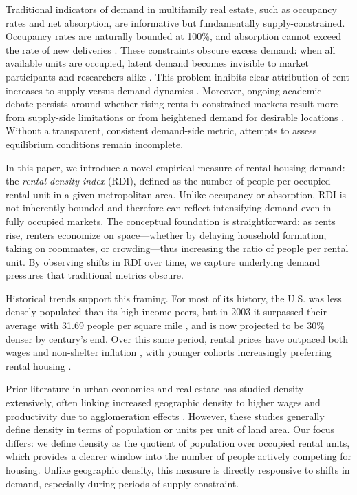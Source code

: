 \documentclass[sn-mathphys-num]{sn-jnl}%
\begin{document}
Traditional indicators of demand in multifamily real estate, such as occupancy rates and net absorption, are informative but fundamentally supply-constrained. Occupancy rates are naturally bounded at 100\%, and absorption cannot exceed the rate of new deliveries \citep{mueller1999real}. These constraints obscure excess demand: when all available units are occupied, latent demand becomes invisible to market participants and researchers alike \citep{gabriel2001rental, sirmans1991determinants, pyhrr1999real}. This problem inhibits clear attribution of rent increases to supply versus demand dynamics \citep{pennington2021does, molloy2022housing}. Moreover, ongoing academic debate persists around whether rising rents in constrained markets result more from supply-side limitations \citep{saiz2010geographic} or from heightened demand for desirable locations \citep{davidoff2015supply}. Without a transparent, consistent demand-side metric, attempts to assess equilibrium conditions remain incomplete.

In this paper, we introduce a novel empirical measure of rental housing demand: the \textit{rental density index} (RDI), defined as the number of people per occupied rental unit in a given metropolitan area. Unlike occupancy or absorption, RDI is not inherently bounded and therefore can reflect intensifying demand even in fully occupied markets. The conceptual foundation is straightforward: as rents rise, renters economize on space---whether by delaying household formation, taking on roommates, or crowding---thus increasing the ratio of people per rental unit. By observing shifts in RDI over time, we capture underlying demand pressures that traditional metrics obscure.

Historical trends support this framing. For most of its history, the U.S. was less densely populated than its high-income peers, but in 2003 it surpassed their average with 31.69 people per square mile \citep{ourworldindataPopulationDensity}, and is now projected to be 30\% denser by century’s end. Over this same period, rental prices have outpaced both wages and non-shelter inflation \citep{feiveson2024rent, stlouisfedConsumerPrice}, with younger cohorts increasingly preferring rental housing \citep{fanniemaeConsumersFeeling}.

Prior literature in urban economics and real estate has studied density extensively, often linking increased geographic density to higher wages and productivity due to agglomeration effects \citep{titman2024city, liu2018vertical}. However, these studies generally define density in terms of population or units per unit of land area. Our focus differs: we define density as the quotient of population over occupied rental units, which provides a clearer window into the number of people actively competing for housing. Unlike geographic density, this measure is directly responsive to shifts in demand, especially during periods of supply constraint.
\end{document}
